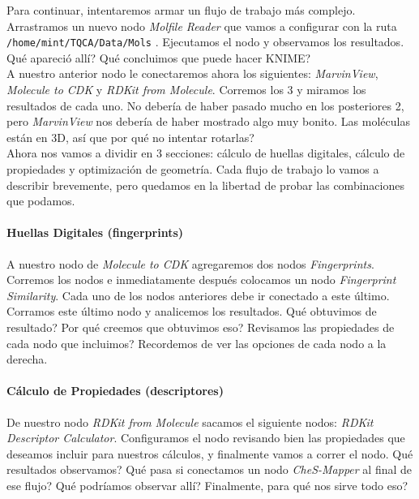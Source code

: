 \documentclass[10pt,letterpaper]{article}
\newcommand{\inlinecode}[1]{
\colorbox{light-gray}{\texttt{#1}}
}
\begin{document}
Para continuar, intentaremos armar un flujo de trabajo m\'as complejo. Arrastramos un nuevo nodo \emph{Molfile Reader} que vamos a configurar con la ruta \inlinecode{/home/mint/TQCA/Data/Mols}. Ejecutamos el nodo y observamos los resultados. Qu\'e apareci\'o all\'i? Qu\'e concluimos que puede hacer KNIME?\\

A nuestro anterior nodo le conectaremos ahora los siguientes: \emph{MarvinView}, \emph{Molecule to CDK} y \emph{RDKit from Molecule}. Corremos los 3 y miramos los resultados de cada uno. No deber\'ia de haber pasado mucho en los posteriores 2, pero \emph{MarvinView} nos deber\'ia de haber mostrado algo muy bonito. Las mol\'eculas est\'an en 3D, as\'i que por qu\'e no intentar rotarlas?\\

Ahora nos vamos a dividir en 3 secciones: c\'alculo de huellas digitales, c\'alculo de propiedades y optimizaci\'on de geometr\'ia. Cada flujo de trabajo lo vamos a describir brevemente, pero quedamos en la libertad de probar las combinaciones que podamos.\\

\paragraph{Huellas Digitales (fingerprints)}
A nuestro nodo de \emph{Molecule to CDK} agregaremos dos nodos \emph{Fingerprints}. Corremos los nodos e inmediatamente despu\'es colocamos un nodo \emph{Fingerprint Similarity}. Cada uno de los nodos anteriores debe ir conectado a este \'ultimo. Corramos este \'ultimo nodo y analicemos los resultados. Qu\'e obtuvimos de resultado? Por qu\'e creemos que obtuvimos eso? Revisamos las propiedades de cada nodo que incluimos? Recordemos de ver las opciones de cada nodo a la derecha.

\paragraph{C\'alculo de Propiedades (descriptores)}
De nuestro nodo \textit{RDKit from Molecule} sacamos el siguiente nodos: \textit{RDKit Descriptor Calculator}. Configuramos el nodo revisando bien las propiedades que deseamos incluir para nuestros c\'alculos, y finalmente vamos a correr el nodo. Qu\'e resultados observamos? Qu\'e pasa si conectamos un nodo \emph{CheS-Mapper} al final de ese flujo? Qu\'e podr\'iamos observar all\'i? Finalmente, para qu\'e nos sirve todo eso?
\end{document}
